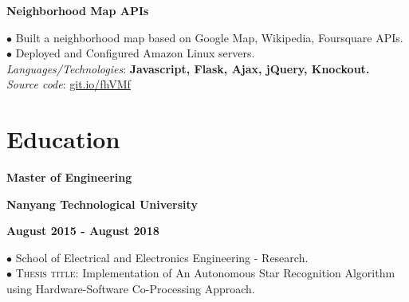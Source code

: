 \documentclass[10pt]{article}
\begin{document}
        \begin{center}
            \textbf{Neighborhood Map APIs}
        \end{center}
        $\bullet$ {Built a neighborhood map based on Google Map, Wikipedia, Foursquare APIs.} \\
        $\bullet$ {Deployed and Configured Amazon Linux servers.} \\
        \emph{Languages/Technologies}: \textbf{Javascript, Flask, Ajax, jQuery, Knockout.} \\
        \emph{Source code}: \href{https://git.io/fhVMf}{git.io/fhVMf}


    \section{Education}
        \vspace{-5mm}

        \begin{multicols}{3}
            \begin{flushleft}
                \textbf{Master of Engineering}
            \end{flushleft}

            \columnbreak

            \begin{center}
                \textbf{Nanyang Technological University}
            \end{center}

            \columnbreak

            \begin{flushright}
                \textbf{August 2015 - August 2018}
            \end{flushright}
        \end{multicols}

        \vspace{-5mm}

        $\bullet$ {School of Electrical and Electronics Engineering - Research.} \\
        $\bullet$ \textsc{Thesis title}: Implementation of An Autonomous Star Recognition Algorithm using Hardware-Software Co-Processing Approach.
\end{document}
